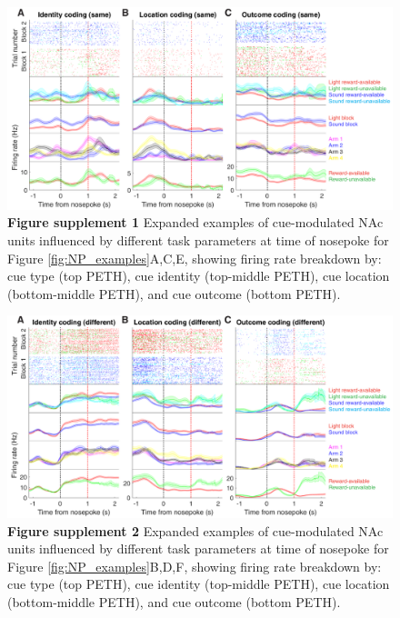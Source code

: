 \documentclass[11pt]{article}
\newcommand{\bsf}[1]{\textbf{#1}}
\begin{document}
 \begin{figure}[ht!]
\centering
\includegraphics[width=\textwidth]{Fig 7 - NP Neural examples SUPP1.pdf}
\caption*{\bsf{Figure supplement 1} Expanded examples of cue-modulated NAc units influenced by different
  task parameters at time of nosepoke for Figure \ref{fig:NP_examples}A,C,E, showing firing rate breakdown by: cue type (top PETH), cue identity (top-middle PETH), cue location (bottom-middle PETH), and cue outcome (bottom PETH).}
\label{fig:NP_examplesSUPP1}
\end{figure} \clearpage

 \begin{figure}[ht!]
\centering
\includegraphics[width=\textwidth]{Fig 7 - NP Neural examples SUPP2.pdf}
\caption*{\bsf{Figure supplement 2} Expanded examples of cue-modulated NAc units influenced by different
  task parameters at time of nosepoke for Figure \ref{fig:NP_examples}B,D,F, showing firing rate breakdown by: cue type (top PETH), cue identity (top-middle PETH), cue location (bottom-middle PETH), and cue outcome (bottom PETH).}
\label{fig:NP_examplesSUPP2}
\end{figure} \clearpage
\end{document}
